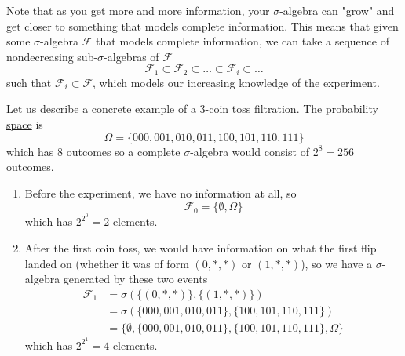 Note that as you get more and more information, your $\sigma$-algebra can "grow" and get closer to something that models complete information. This means that given some $\sigma$-algebra $\mathcal{F}$ that models complete information, we can take a sequence of nondecreasing sub-$\sigma$-algebras of $\mathcal{F}$ 
\begin{equation}
	\mathcal{F}_1 \subset \mathcal{F}_2 \subset \ldots \subset \mathcal{F}_i \subset \ldots
\end{equation}
such that $\mathcal{F}_i \subset \mathcal{F}$, which models our increasing knowledge of the experiment. 

\begin{example}
	\label{ex:filtration-of-3-coin-tosses}
	Let us describe a concrete example of a 3-coin toss filtration. The \hyperref[prob-def:probability-space]{probability space} is 
	\begin{equation}
		\Omega = \{000, 001, 010, 011, 100, 101, 110, 111\}
	\end{equation}
	which has $8$ outcomes so a complete $\sigma$-algebra would consist of $2^8 = 256$ outcomes. 
	\begin{enumerate}
		\item Before the experiment, we have no information at all, so 
		\begin{equation}
			\mathcal{F}_0 = \{\emptyset, \Omega\}
		\end{equation}
		which has $2^{2^0} = 2$ elements. 
		
		\item After the first coin toss, we would have information on what the first flip landed on (whether it was of form $( 0, \ast, \ast)$ or $(1, \ast, \ast)$), so we have a $\sigma$-algebra generated by these two events 
		\begin{align*}
			\mathcal{F}_1 & = \sigma(\{( 0, \ast, \ast)\}, \{(1, \ast, \ast)\}) \\
			& = \sigma(\{000, 001, 010, 011\}, \{100, 101, 110, 111\}) \\
			& = \{\emptyset, \{000, 001, 010, 011\}, \{100, 101, 110, 111\}, \Omega\}
		\end{align*}
		which has $2^{2^1} = 4$ elements. 
		

\end{enumerate}
\end{example}
